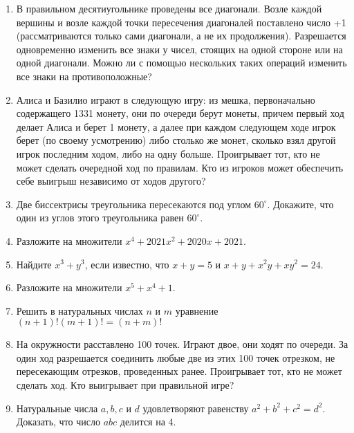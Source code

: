 \documentclass{article}
\begin{document}
\begin{enumerate}[label*=\protect\fbox{\arabic{enumi}}]
\item В правильном десятиугольнике проведены все диагонали. Возле каждой вершины и возле каждой точки пересечения диагоналей поставлено число +1 (рассматриваются только сами диагонали, а не их продолжения). Разрешается одновременно изменить все знаки у чисел, стоящих на одной стороне или на одной диагонали. Можно ли с помощью нескольких таких операций изменить все знаки на противоположные?

\item Алиса и Базилио играют в следующую игру:
из мешка, первоначально содержащего 1331 монету, они по очереди берут монеты, причем первый ход делает Алиса и берет 1 монету, а далее при каждом следующем ходе игрок берет (по своему усмотрению) либо столько же монет, сколько взял другой игрок последним ходом, либо на одну больше. Проигрывает тот, кто не может сделать очередной ход по правилам. Кто из игроков может обеспечить себе выигрыш независимо от ходов другого? 

\item Две биссектрисы треугольника пересекаются под углом $60^\circ$. Докажите, что один из углов этого треугольника равен $60^\circ$.

\item Разложите на множители $x^4 + 2021x^2 + 2020x + 2021$.

\item Найдите $x^3 + y^3$, если известно, что $x + y = 5$ и $x + y + x^2y + xy^2 = 24$.

\item Разложите на множители $x^5 + x^4 + 1$.

\item Решить в натуральных числах $n$ и $m$ уравнение $(n+1)!(m+1)!=(n+m)!$

\item На окружности расставлено 100 точек. Играют двое, они ходят по очереди. За один ход разрешается соединить любые две из этих 100 точек отрезком, не пересекающим отрезков, проведенных ранее. Проигрывает тот, кто не может сделать ход. Кто выигрывает при правильной игре?

\item Натуральные числа $a, b, c$ и $d$ удовлетворяют равенству $a^2 + b^2 + c^2 = d^2$.
Доказать, что число $abc$ делится на 4.


\end{enumerate}
\end{document}

